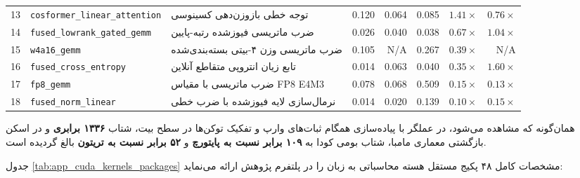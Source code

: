 \begin{table}[H]
\begin{tabular}{rllrrrrr}
13 & \texttt{cosformer\_linear\_attention} & توجه خطی بازوزن‌دهی کسینوسی & 0.120 & 0.064 & 0.085 & $\mathbf{1.41\times}$ & $0.76\times$ \\
14 & \texttt{fused\_lowrank\_gated\_gemm} & ضرب ماتریسی فیوزشده رتبه-پایین & 0.026 & 0.040 & 0.038 & $0.67\times$ & $\mathbf{1.04\times}$ \\
15 & \texttt{w4a16\_gemm} & ضرب ماتریسی وزن ۴-بیتی بسته‌بندی‌شده & 0.105 & N/A & 0.267 & $0.39\times$ & N/A \\
16 & \texttt{fused\_cross\_entropy} & تابع زیان انتروپی متقاطع آنلاین & 0.014 & 0.063 & 0.040 & $0.35\times$ & $\mathbf{1.60\times}$ \\
17 & \texttt{fp8\_gemm} & ضرب ماتریسی با مقیاس FP8 E4M3 & 0.078 & 0.068 & 0.509 & $0.15\times$ & $0.13\times$ \\
18 & \texttt{fused\_norm\_linear} & نرمال‌سازی لایه فیوزشده با ضرب خطی & 0.014 & 0.020 & 0.139 & $0.10\times$ & $0.15\times$ \\
\bottomrule
\end{tabular}
\end{table}

همان‌گونه که مشاهده می‌شود، در عملگر  با پیاده‌سازی همگام ثبات‌های وارپ و تفکیک توکن‌ها در سطح بیت، شتاب \textbf{۱۳۳۶ برابری} و در اسکن بازگشتی  معماری مامبا، شتاب بومی کودا به \textbf{۱۰۹ برابر نسبت به پایتورچ} و \textbf{۵۲ برابر نسبت به تریتون} بالغ گردیده است.

جدول \ref{tab:app_cuda_kernels_packages} مشخصات کامل ۴۸ پکیج مستقل هسته محاسباتی به زبان  را در پلتفرم پژوهش ارائه می‌نماید:

